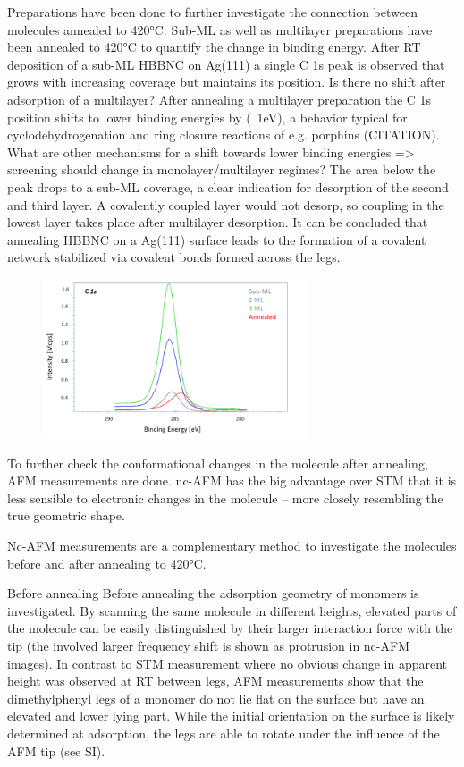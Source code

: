 Preparations have been done to further investigate the connection between molecules annealed to 420°C. Sub-ML as well as multilayer preparations have been annealed to 420°C to quantify the change in binding energy. After RT deposition of a sub-ML HBBNC on Ag(111) a single C 1s peak is observed that grows with increasing coverage but maintains its position.
Is there no shift after adsorption of a multilayer?
After annealing a multilayer preparation the C 1s position shifts to lower binding energies by (~1eV), a behavior typical for cyclodehydrogenation and ring closure reactions of e.g. porphins (CITATION). What are other mechanisms for a shift towards lower binding energies => screening should change in monolayer/multilayer regimes? The area below the peak drops to a sub-ML coverage, a clear indication for desorption of the second and third layer. A covalently coupled layer would not desorp, so coupling in the lowest layer takes place after multilayer desorption.
It can be concluded that annealing HBBNC on a Ag(111) surface leads to the formation of a covalent network stabilized via covalent bonds formed across the legs.

\begin{figure}[] \centering
	\includegraphics[width=0.7\textwidth]{./images/hbbnc-xps1}
	\caption{}
	\label{}
\end{figure}

To further check the conformational changes in the molecule after annealing, AFM measurements are done. nc-AFM has the big advantage over STM that it is less sensible to electronic changes in the molecule – more closely resembling the true geometric shape.

Nc-AFM measurements are a complementary method to investigate the molecules before and after annealing to 420°C. 

Before annealing
Before annealing the adsorption geometry of monomers is investigated. By scanning the same molecule in different heights, elevated parts of the molecule can be easily distinguished by their larger interaction force with the tip (the involved larger frequency shift is shown as protrusion in nc-AFM images). In contrast to STM measurement where no obvious change in apparent height was observed at RT between legs, AFM measurements show that the dimethylphenyl legs of a monomer do not lie flat on the surface but have an elevated and lower lying part. While the initial orientation on the surface is likely determined at adsorption, the legs are able to rotate under the influence of the AFM tip (see SI).

